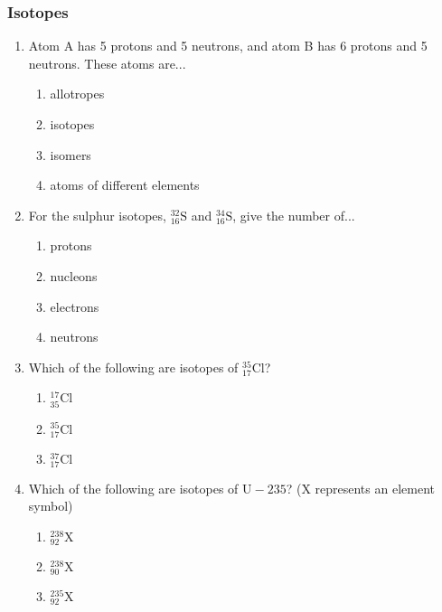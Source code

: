             \subsubsection{  Isotopes }
            \nopagebreak
        \label{m38753*id258162}\begin{enumerate}[noitemsep, label=\textbf{\arabic*}. ] 
            \label{m38753*uid50}\item Atom A has 5 protons and 5 neutrons, and atom B has 6 protons and 5 neutrons. These atoms are...
\label{m38753*id258178}\begin{enumerate}[noitemsep, label=\textbf{\alph*}. ] 
            \label{m38753*uid51}\item allotropes
\label{m38753*uid52}\item isotopes
\label{m38753*uid53}\item isomers
\label{m38753*uid54}\item atoms of different elements
\end{enumerate}
                \label{m38753*uid55}\item For the sulphur isotopes, $_{16}^{32}\mathrm{S}$ and $_{16}^{34}\mathrm{S}$, give the number of...
\label{m38753*id258277}\begin{enumerate}[noitemsep, label=\textbf{\alph*}. ] 
            \label{m38753*uid56}\item protons
\label{m38753*uid57}\item nucleons
\label{m38753*uid58}\item electrons
\label{m38753*uid59}\item neutrons
\end{enumerate}
                \label{m38753*uid60}\item Which of the following are isotopes of $_{17}^{35}\mathrm{Cl}$?
\label{m38753*id258355}\begin{enumerate}[noitemsep, label=\textbf{\alph*}. ] 
            \label{m38753*uid61}\item $_{35}^{17}\mathrm{Cl}$
\label{m38753*uid62}\item $_{17}^{35}\mathrm{Cl}$
\label{m38753*uid63}\item $_{17}^{37}\mathrm{Cl}$
\end{enumerate}
                \label{m38753*uid64}\item Which of the following are isotopes of $\mathrm{U-}235$? (X represents an element symbol)
\label{m38753*id258452}\begin{enumerate}[noitemsep, label=\textbf{\alph*}. ] 
            \label{m38753*uid65}\item $_{92}^{238}\mathrm{X}$
\label{m38753*uid66}\item $_{90}^{238}\mathrm{X}$
\label{m38753*uid67}\item $_{92}^{235}\mathrm{X}$
\end{enumerate}
                \end{enumerate}
